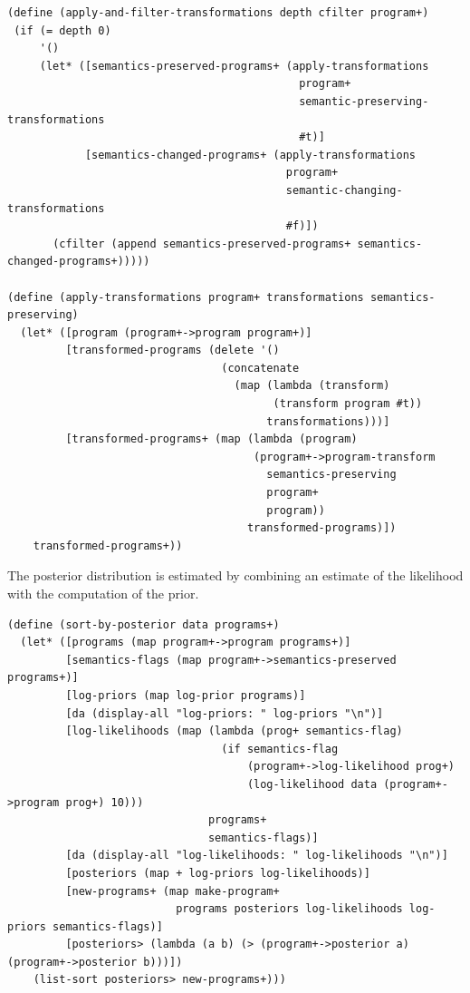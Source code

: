 \documentclass[a4paper,10pt]{article}
\begin{document}
\begin{verbatim}
(define (apply-and-filter-transformations depth cfilter program+)
 (if (= depth 0)
     '()
     (let* ([semantics-preserved-programs+ (apply-transformations 
                                             program+ 
                                             semantic-preserving-transformations 
                                             #t)]
            [semantics-changed-programs+ (apply-transformations 
                                           program+ 
                                           semantic-changing-transformations 
                                           #f)])
       (cfilter (append semantics-preserved-programs+ semantics-changed-programs+)))))

(define (apply-transformations program+ transformations semantics-preserving)
  (let* ([program (program+->program program+)]
         [transformed-programs (delete '() 
                                 (concatenate 
                                   (map (lambda (transform) 
                                         (transform program #t)) 
                                        transformations)))]
         [transformed-programs+ (map (lambda (program) 
                                      (program+->program-transform 
                                        semantics-preserving 
                                        program+ 
                                        program)) 
                                     transformed-programs)])
    transformed-programs+))
\end{verbatim}
The posterior distribution is estimated by combining an estimate of the likelihood with the computation of the prior.  
\begin{verbatim}
(define (sort-by-posterior data programs+)
  (let* ([programs (map program+->program programs+)]
         [semantics-flags (map program+->semantics-preserved programs+)]
         [log-priors (map log-prior programs)]
         [da (display-all "log-priors: " log-priors "\n")]
         [log-likelihoods (map (lambda (prog+ semantics-flag)
                                 (if semantics-flag
                                     (program+->log-likelihood prog+)
                                     (log-likelihood data (program+->program prog+) 10))) 
                               programs+ 
                               semantics-flags)]
         [da (display-all "log-likelihoods: " log-likelihoods "\n")]
         [posteriors (map + log-priors log-likelihoods)] 
         [new-programs+ (map make-program+ 
                          programs posteriors log-likelihoods log-priors semantics-flags)]
         [posteriors> (lambda (a b) (> (program+->posterior a) (program+->posterior b)))])
    (list-sort posteriors> new-programs+)))
\end{verbatim}
\end{document}
